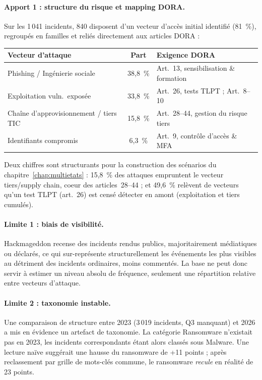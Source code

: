 \paragraph{Apport 1 : structure du risque et mapping DORA.} Sur les 1\,041
incidents, 840 disposent d'un vecteur d'accès initial identifié (81~\%),
regroupés en familles et reliés directement aux articles DORA :

\begin{center}
\renewcommand{\arraystretch}{1.3}
\begin{tabular}{>{\raggedright}p{5cm} c >{\raggedright\arraybackslash}p{6cm}}
\toprule
\rowcolor{lightblue}
\textbf{Vecteur d'attaque} & \textbf{Part} & \textbf{Exigence DORA} \\
\midrule
Phishing / Ingénierie sociale & 38{,}8~\% & Art.~13, sensibilisation \& formation \\
Exploitation vuln.\ exposée & 33{,}8~\% & Art.~26, tests TLPT ; Art.~8--10 \\
Chaîne d'approvisionnement / tiers TIC & 15{,}8~\% & Art.~28--44, gestion du risque tiers \\
Identifiants compromis & 6{,}3~\% & Art.~9, contrôle d'accès \& MFA \\
\bottomrule
\end{tabular}
\end{center}

Deux chiffres sont structurants pour la construction des scénarios du
chapitre~\ref{chap:multietats} : 15{,}8~\% des attaques empruntent le vecteur tiers/supply
chain, coeur des articles~28--44 ; et 49{,}6~\% relèvent de vecteurs
qu'un test TLPT (art.~26) est censé détecter en amont (exploitation et
tiers cumulés).

\paragraph{Limite 1 : biais de visibilité.} Hackmageddon recense des
incidents rendus publics, majoritairement médiatiques ou déclarés, ce qui
sur-représente structurellement les événements les plus visibles au détriment
des incidents ordinaires, moins commentés. La base ne peut donc servir à
estimer un niveau absolu de fréquence, seulement une répartition relative
entre vecteurs d'attaque.

\paragraph{Limite 2 : taxonomie instable.} Une comparaison de structure entre
2023 (3\,019 incidents, Q3 manquant) et 2026 a mis en évidence un artefact de
taxonomie. La catégorie \og Ransomware\fg{} n'existait pas en 2023, les incidents
correspondants étant alors classés sous \og Malware\fg{}. Une lecture naïve
suggérait une hausse du ransomware de +11 points ; après reclassement par
grille de mots-clés commune, le ransomware \emph{recule} en réalité de
23 points.

